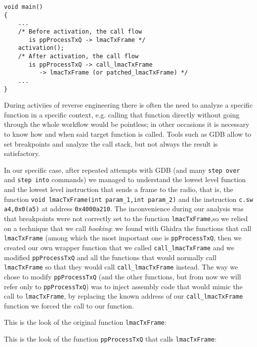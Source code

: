 \newsavebox\funmain
\begin{lrbox}{\funmain}
\begin{lstlisting}
void main()
{
    ...
    /* Before activation, the call flow
       is ppProcessTxQ -> lmacTxFrame */
    activation();
    /* After activation, the call flow
       is ppProcessTxQ -> call_lmacTxFrame
          -> lmacTxFrame (or patched_lmacTxFrame) */
    ...
}
\end{lstlisting}
\end{lrbox}


During activiies of reverse engineering there is often the need to analyze a specific function
in a specific context, e.g. calling that function directly without going through the whole
workflow would be pointless; in other occasions it is necessary to know how and when said target
function is called. Tools such as GDB allow to set breakpoints and analyze the call stack,
but not always the result is satisfactory.

In our specific case, after repeated attempts with GDB (and many \texttt{step over} and \texttt{step into} commands)
we managed to understand the lowest level function and the lowest level instruction that sends a frame to the radio,
that is, the function \texttt{void lmacTxFrame(int param\_1,int param\_2)} and the instruction \texttt{c.sw a4,0x0(a5)}
at address \texttt{0x4000a210}.
The inconvenience during our analysis was that breakpoints were not correctly set to the function \texttt{lmacTxFrame},so we relied on a technique that we call \textit{hooking}: we found with Ghidra the functions that call
\texttt{lmacTxFrame} (among which the most important one is \texttt{ppProcessTxQ}, then we created our own wrapper function that we called \texttt{call\_lmacTxFrame} and we 
modified \texttt{ppProcessTxQ} and all the functions that would normally call \texttt{lmacTxFrame}
so that they would call \texttt{call\_lmacTxFrame} instead. 
The way we chose to modify \texttt{ppProcessTxQ} (and the other functions, but from now we will refer only to
\texttt{ppProcessTxQ}) was to inject assembly code that would mimic the call to \texttt{lmacTxFrame},
by replacing the known address of our \texttt{call\_lmacTxFrame} function we forced the call to our function.

This is the look of the original function \texttt{lmacTxFrame}:
\usebox\funlmactxframe

This is the look of the function \texttt{ppProcessTxQ} that calls \texttt{lmacTxFrame}:
\usebox\funprocesstxq

